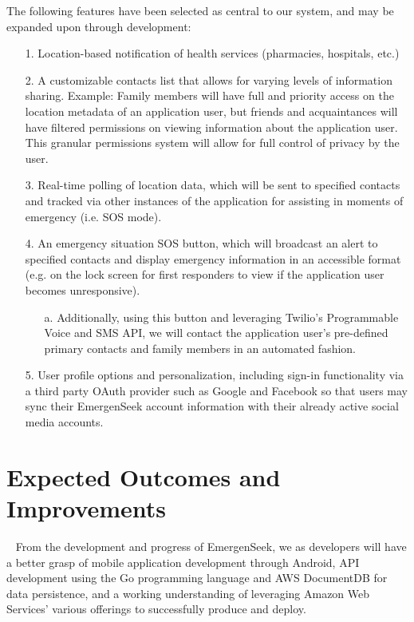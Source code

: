\documentclass[10pt, a4paper]{article}
\begin{document}
The following features have been selected as central to our system, and may be expanded upon through development:
\begin{enumerate}
\item[1.] Location-based notification of health services (pharmacies, hospitals, etc.) 
\item[2.] A customizable contacts list that allows for varying levels of information sharing. Example: Family members will have full and priority access on the location metadata of an application user, but friends and acquaintances will have filtered permissions on viewing information about the application user. This granular permissions system will allow for full control of privacy by the user.
\item[3.] Real-time polling of location data, which will be sent to specified contacts and tracked via other instances of the application for assisting in moments of emergency (i.e. SOS mode).
\item[4.] An emergency situation SOS button, which will broadcast an alert to specified contacts and display emergency information in an accessible format (e.g. on the lock screen for first responders to view if the application user becomes unresponsive).
	\begin{itemize}
		\item[a.] Additionally, using this button and leveraging Twilio’s Programmable Voice and SMS API, we will contact the application user’s pre-defined primary contacts and family members in an automated fashion.
	\end{itemize}
\item[5.] User profile options and personalization, including sign-in functionality via a third party OAuth provider such as Google and Facebook so that users may sync their EmergenSeek account information with their already active social media accounts.
\end{enumerate}

\section{Expected Outcomes and Improvements}
\par ~ From the development and progress of EmergenSeek, we as developers will have a better grasp of mobile application development through Android, API development using the Go programming language and AWS DocumentDB for data persistence, and a working understanding of leveraging Amazon Web Services’ various offerings to successfully produce and deploy.
\end{document}
